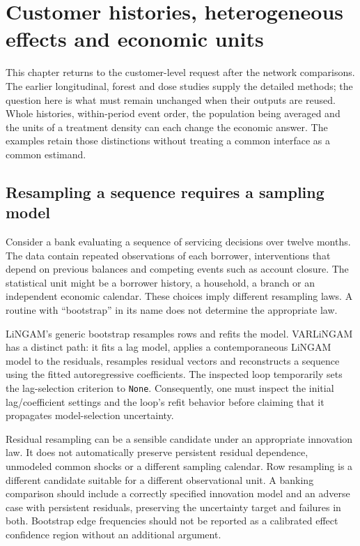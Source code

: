 \chapter{Customer histories, heterogeneous effects and economic units}
\label{v131:histories-forests}

This chapter returns to the customer-level request after the network comparisons.
The earlier longitudinal, forest and dose studies supply the detailed methods;
the question here is what must remain unchanged when their outputs are reused.
Whole histories, within-period event order, the population being averaged and
the units of a treatment density can each change the economic answer. The
examples retain those distinctions without treating a common interface as a
common estimand.

\section{Resampling a sequence requires a sampling model}

Consider a bank evaluating a sequence of servicing decisions over twelve
months. The data contain repeated observations of each borrower, interventions
that depend on previous balances and competing events such as account closure.
The statistical unit might be a borrower history, a household, a branch or an
independent economic calendar. These choices imply different resampling laws.
A routine with ``bootstrap'' in its name does not determine the appropriate law.

LiNGAM's generic bootstrap resamples rows and refits the model. VARLiNGAM has
a distinct path: it fits a lag model, applies a contemporaneous LiNGAM model to
the residuals, resamples residual vectors and reconstructs a sequence using the
fitted autoregressive coefficients. The inspected loop temporarily sets the
lag-selection criterion to \texttt{None}. Consequently, one must inspect the
initial lag/coefficient settings and the loop's refit behavior before claiming
that it propagates model-selection uncertainty. \cite{v131_sw_lingam}

Residual resampling can be a sensible candidate under an appropriate innovation
law. It does not automatically preserve persistent residual dependence,
unmodeled common shocks or a different sampling calendar. Row resampling is a
different candidate suitable for a different observational unit. A banking
comparison should include a correctly specified innovation model and an adverse
case with persistent residuals, preserving the uncertainty target and failures
in both. Bootstrap edge frequencies should not be reported as a calibrated
effect confidence region without an additional argument.

